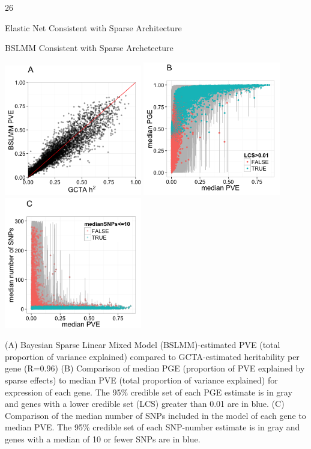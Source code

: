 \documentclass[final]{beamer}
\newcommand{\ColWidth}{26}
\begin{document}
\begin{frame}{}
\begin{textblock}{\ColWidth}
\begin{block}{Elastic Net Consistent with Sparse Architecture}
\end{block}
\begin{block}{BSLMM Consistent with Sparse Archetecture}
	\begin{center}
		\includegraphics[width=0.45\textwidth]{plots/Fig-DGN-BSLMM-A.png}
		\includegraphics[width=0.45\textwidth]{plots/Fig-DGN-BSLMM-B.png}\\
		\includegraphics[width=0.45\textwidth]{plots/Fig-DGN-BSLMM-C.png}\\
	 \end{center}
	{\tiny (A) Bayesian Sparse Linear Mixed Model (BSLMM)-estimated PVE (total proportion of variance explained) compared to GCTA-estimated heritability per gene (R=0.96) (B) Comparison of median PGE (proportion of PVE explained by sparse effects) to median PVE (total proportion of variance explained) for expression of each gene. The 95\% credible set of each PGE estimate is in gray and genes with a lower credible set (LCS) greater than 0.01 are in blue. (C) Comparison of the median number of SNPs included in the model of each gene to median PVE. The 95\% credible set of each SNP-number estimate is in gray and genes with a median of 10 or fewer SNPs are in blue.\\}
\end{block}



\end{textblock}
\end{frame}
\end{document}
